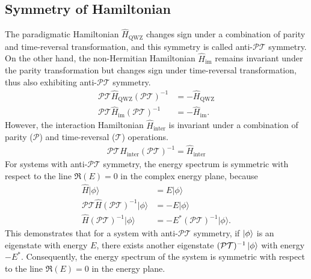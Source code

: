 \documentclass[longbibliography, aps, prx, amsmath, amssymb, amsfonts, twocolumn,superscriptaddress, footinbib]{revtex4-1}
\begin{document}
	\subsection{Symmetry of Hamiltonian~\label{sec:symmetry_Hamiltonian}}
	The paradigmatic Hamiltonian $\hat{H}_{\text{QWZ}}$ changes sign under a combination of parity and time-reversal transformation, and this symmetry is called anti-$\mathcal{PT}$ symmetry.
	On the other hand, the non-Hermitian Hamiltonian $\hat{H}_{\text{im}}$ remains invariant under the parity transformation but changes sign under time-reversal transformation, thus also exhibiting anti-$\mathcal{PT}$ symmetry.
	\begin{equation}
		\begin{split}
			\mathcal{PT} \hat{H}_{\text{QWZ}} (\mathcal{PT})^{-1} &= -\hat{H}_{\text{QWZ}} \\
			\mathcal{PT} \hat{H}_{\text{im}} (\mathcal{PT})^{-1} &= -\hat{H}_{\text{im}}.
		\end{split}
	\end{equation}
	However, the interaction Hamiltonian $\hat{H}_{\text{inter}}$ is invariant under a combination of parity ($\mathcal{P}$) and time-reversal ($\mathcal{T}$) operations.
	\begin{equation}
		\begin{split}
			\mathcal{PT} \hat{H}_{\text{inter}} (\mathcal{PT})^{-1} = \hat{H}_{\text{inter}}%
		\end{split}
	\end{equation}
	For systems with anti-$\mathcal{PT}$ symmetry, the energy spectrum is symmetric with respect to the line $\Re(E)=0$ in the complex energy plane, because
	\begin{equation}
		\begin{split}
			\hat{H} \vert \phi \rangle &= E \vert \phi \rangle\\
			\mathcal{PT} \hat{H} (\mathcal{PT})^{-1} \vert \phi \rangle &= - E \vert \phi \rangle\\
			\hat{H} (\mathcal{PT})^{-1} \vert \phi \rangle &= - E^* (\mathcal{PT})^{-1} \vert \phi \rangle.
		\end{split}
	\end{equation}
	This demonstrates that for a system with anti-$\mathcal{PT}$ symmetry, if $\ket{\phi}$ is an eigenstate with energy $E$, there exists another eigenstate $(\mathcal{PT})^{-1} \ket{\phi}$ with energy $-E^*$. Consequently, the energy spectrum of the system is symmetric with respect to the line $\Re(E)=0$ in the energy plane.
\end{document}
